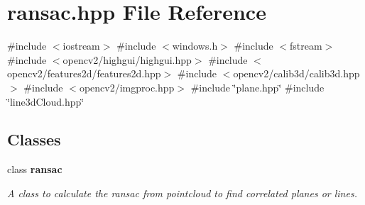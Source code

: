 \section{ransac.\+hpp File Reference}
\label{ransac_8hpp}
{\ttfamily \#include $<$iostream$>$}\newline
{\ttfamily \#include $<$windows.\+h$>$}\newline
{\ttfamily \#include $<$fstream$>$}\newline
{\ttfamily \#include $<$opencv2/highgui/highgui.\+hpp$>$}\newline
{\ttfamily \#include $<$opencv2/features2d/features2d.\+hpp$>$}\newline
{\ttfamily \#include $<$opencv2/calib3d/calib3d.\+hpp$>$}\newline
{\ttfamily \#include $<$opencv2/imgproc.\+hpp$>$}\newline
{\ttfamily \#include \char`\"{}plane.\+hpp\char`\"{}}\newline
{\ttfamily \#include \char`\"{}line3d\+Cloud.\+hpp\char`\"{}}\newline
\subsection*{Classes}
\begin{DoxyCompactItemize}
\item 
class \textbf{ ransac}
\begin{DoxyCompactList}\small\item\em A class to calculate the ransac from pointcloud to find correlated planes or lines. \end{DoxyCompactList}\end{DoxyCompactItemize}
